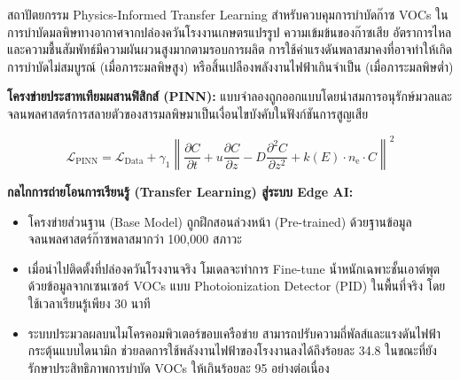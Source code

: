\begin{aibox}{สถาปัตยกรรม Physics-Informed Transfer Learning สำหรับควบคุมการบำบัดก๊าซ VOCs}
ในการบำบัดมลพิษทางอากาศจากปล่องควันโรงงานเกษตรแปรรูป ความเข้มข้นของก๊าซเสีย อัตราการไหล และความชื้นสัมพัทธ์มีความผันผวนสูงมากตามรอบการผลิต การใช้ค่าแรงดันพลาสมาคงที่อาจทำให้เกิดการบำบัดไม่สมบูรณ์ (เมื่อภาระมลพิษสูง) หรือสิ้นเปลืองพลังงานไฟฟ้าเกินจำเป็น (เมื่อภาระมลพิษต่ำ)

\textbf{โครงข่ายประสาทเทียมผสานฟิสิกส์ (PINN):}
แบบจำลองถูกออกแบบโดยนำสมการอนุรักษ์มวลและจลนพลศาสตร์การสลายตัวของสารมลพิษมาเป็นเงื่อนไขบังคับในฟังก์ชันการสูญเสีย

\begin{equation}
    \mathcal{L}_{\text{PINN}} = \mathcal{L}_{\text{Data}} + \gamma_1 \left\| \frac{\partial C}{\partial t} + u \frac{\partial C}{\partial z} - D \frac{\partial^2 C}{\partial z^2} + k(E) \cdot n_{\text{e}} \cdot C \right\|^2
\end{equation}

\textbf{กลไกการถ่ายโอนการเรียนรู้ (Transfer Learning) สู่ระบบ Edge AI:}
\begin{itemize}
    \item โครงข่ายส่วนฐาน (Base Model) ถูกฝึกสอนล่วงหน้า (Pre-trained) ด้วยฐานข้อมูลจลนพลศาสตร์ก๊าซพลาสมากว่า 100,000 สภาวะ
    \item เมื่อนำไปติดตั้งที่ปล่องควันโรงงานจริง โมเดลจะทำการ Fine-tune น้ำหนักเฉพาะชั้นเอาต์พุตด้วยข้อมูลจากเซนเซอร์ VOCs แบบ Photoionization Detector (PID) ในพื้นที่จริง โดยใช้เวลาเรียนรู้เพียง 30 นาที
    \item ระบบประมวลผลบนไมโครคอมพิวเตอร์ขอบเครือข่าย สามารถปรับความถี่พัลส์และแรงดันไฟฟ้ากระตุ้นแบบไดนามิก ช่วยลดการใช้พลังงานไฟฟ้าของโรงงานลงได้ถึงร้อยละ 34.8 ในขณะที่ยังรักษาประสิทธิภาพการบำบัด VOCs ให้เกินร้อยละ 95 อย่างต่อเนื่อง
\end{itemize}
\end{aibox}

